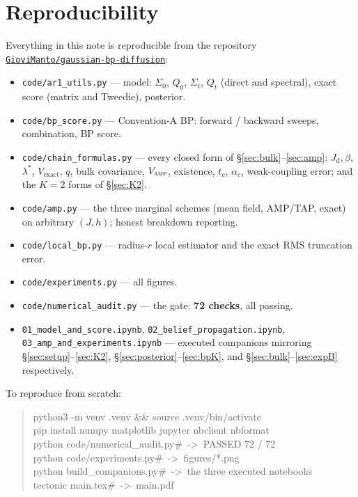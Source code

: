 \documentclass[11pt]{article}
\theoremstyle{definition}
\newcommand{\Sig}{\Sigma}
\newcommand{\Qt}{Q_t}
\newcommand{\Jd}{J_{\mathrm d}}
\begin{document}
\section{Reproducibility}\label{sec:repro}

Everything in this note is reproducible from the repository
\href{https://github.com/GioviManto/gaussian-bp-diffusion}{\texttt{GioviManto/gaussian-bp-diffusion}}:

\begin{itemize}[leftmargin=1.6em, itemsep=1pt]
\item \texttt{code/ar1\_utils.py} --- model: $\Sig_0$, $Q_0$, $\Sig_t$,
$\Qt$ (direct and spectral), exact score (matrix and Tweedie), posterior.
\item \texttt{code/bp\_score.py} --- Convention-A BP: forward / backward
sweeps, combination, BP score.
\item \texttt{code/chain\_formulas.py} --- every closed form of
\S\ref{sec:bulk}--\ref{sec:amp}: $\Jd,\beta$, $\lambda^\ast$,
$V_{\mathrm{exact}}$, $q$, bulk covariance, $V_{\textsc{amp}}$, existence,
$t_c$, $\alpha_c$, weak-coupling error; and the $K=2$ forms of \S\ref{sec:K2}.
\item \texttt{code/amp.py} --- the three marginal schemes (mean field,
AMP/TAP, exact) on arbitrary $(J,h)$; honest breakdown reporting.
\item \texttt{code/local\_bp.py} --- radius-$r$ local estimator and the exact
RMS truncation error.
\item \texttt{code/experiments.py} --- all figures.
\item \texttt{code/numerical\_audit.py} --- the gate: \textbf{72 checks},
all passing.
\item \texttt{01\_model\_and\_score.ipynb},
\texttt{02\_belief\_propagation.ipynb},
\texttt{03\_amp\_and\_experiments.ipynb} --- executed companions mirroring
\S\ref{sec:setup}--\ref{sec:K2}, \S\ref{sec:posterior}--\ref{sec:bpK}, and
\S\ref{sec:bulk}--\ref{sec:expB} respectively.
\end{itemize}

\noindent To reproduce from scratch:
\begin{quote}\small\ttfamily
python3 -m venv .venv \&\& source .venv/bin/activate\\
pip install numpy matplotlib jupyter nbclient nbformat\\
python code/numerical\_audit.py\hspace{2.2em}\#\ ->\ PASSED 72 / 72\\
python code/experiments.py\hspace{4.05em}\#\ ->\ figures/*.png\\
python build\_companions.py\hspace{3.6em}\#\ ->\ the three executed notebooks\\
tectonic main.tex\hspace{7.45em}\#\ ->\ main.pdf
\end{quote}
\end{document}
